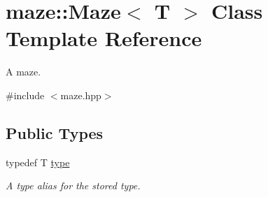 \hypertarget{classmaze_1_1Maze}{}\section{maze\+:\+:Maze$<$ T $>$ Class Template Reference}
\label{classmaze_1_1Maze}


A maze.  




{\ttfamily \#include $<$maze.\+hpp$>$}

\subsection*{Public Types}
\begin{DoxyCompactItemize}
\item 
\mbox{\label{classmaze_1_1Maze_a9f056be7a10507d578e4608e31a3d6fc}} 
typedef T \hyperlink{classmaze_1_1Maze_a9f056be7a10507d578e4608e31a3d6fc}{type}
\begin{DoxyCompactList}\small\item\em A type alias for the stored type. \end{DoxyCompactList}\end{DoxyCompactItemize}
